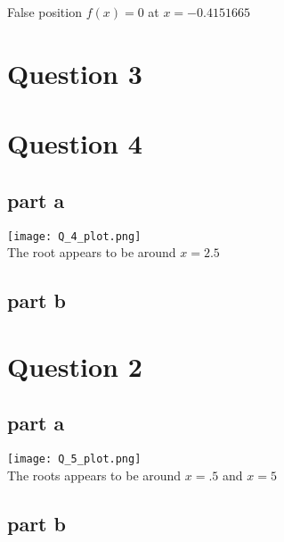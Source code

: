 \documentclass[11pt]{article} %
\begin{document}
False position $f(x) = 0$ at $x = -0.4151665$

\section{Question 3}



\section{Question 4}

\subsection{part a}

\texttt{[image: Q\_4\_plot.png]} \\
The root appears to be around $x=2.5$

\subsection{part b}

\section{Question 2}

\subsection{part a}

\texttt{[image: Q\_5\_plot.png]} \\
The roots appears to be around $x=.5$ and $x=5$

\subsection{part b}
\end{document}
